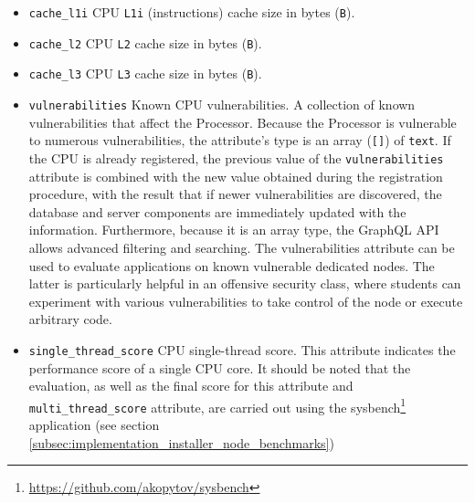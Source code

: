 \begin{itemize}
  \item \texttt{cache\_l1i}
    \newline
    CPU \texttt{L1i} (instructions) cache size in bytes (\texttt{B}).

  \item \texttt{cache\_l2}
    \newline
    CPU \texttt{L2} cache size in bytes (\texttt{B}).

  \item \texttt{cache\_l3}
    \newline
    CPU \texttt{L3} cache size in bytes (\texttt{B}).

  \item \texttt{vulnerabilities}
    \newline
    Known CPU vulnerabilities.
    \newline
    A collection of known vulnerabilities that affect the Processor.
    \newline
    Because the Processor is vulnerable to numerous vulnerabilities, the attribute's
    type is an array (\texttt{[]}) of \texttt{text}. If the CPU is already registered,
    the previous value of the \texttt{vulnerabilities} attribute is combined with
    the new value obtained during the registration procedure, with the result
    that if newer vulnerabilities are discovered, the database and server components
    are immediately updated with the information. Furthermore, because it is an array
    type, the GraphQL API allows advanced filtering and searching.
    \newline
    The vulnerabilities attribute can be used to evaluate applications on known vulnerable
    dedicated nodes. The latter is particularly helpful in an offensive security
    class, where students can experiment with various vulnerabilities to take control
    of the node or execute arbitrary code.

  \item \texttt{single\_thread\_score}
    \newline
    CPU single-thread score.
    \newline
    This attribute indicates the performance score of a single CPU core.
    \newline
    It should be noted that the evaluation, as well as the final score for this attribute
    and \texttt{multi\_thread\_score} attribute, are carried out using the sysbench\footnote{\url{https://github.com/akopytov/sysbench}}
    application (see section
    \ref{subsec:implementation_installer_node_benchmarks})


\end{itemize}
